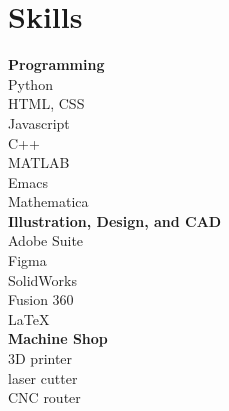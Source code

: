 \documentclass[10pt]{article} %
\begin{document}
\begin{minipage}[t]{0.2\textwidth}
 \section*{Skills}
\textbf{Programming}\\
Python\\
HTML, CSS\\
Javascript\\
C++\\
MATLAB\\
Emacs\\
Mathematica\\

\textbf{Illustration, Design, and CAD}\\
Adobe Suite\\
Figma\\
SolidWorks\\
Fusion 360\\
LaTeX\\
\textbf{Machine Shop}\\
3D printer\\ laser cutter\\ CNC router\\
\end{minipage}
\end{document}
